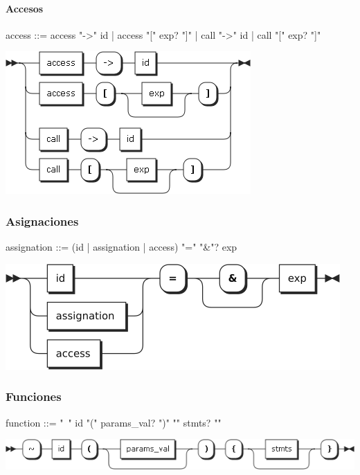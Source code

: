 \paragraph{Accesos}
\begin{multicols}{2}
\begin{myverbatim}[style=nonumbers, basicstyle=\tiny]      
access ::=  access "->" id
         |  access "[" exp? "]"
         |  call "->" id
         |  call "[" exp? "]"
\end{myverbatim}  
\columnbreak	
\begin{center}
\includegraphics[scale=0.4]{diagram/access.png} \\
\end{center}
\end{multicols}

\subsubsection{Asignaciones}
\begin{multicols}{2}
\begin{myverbatim}[style=nonumbers, basicstyle=\tiny]      
assignation ::=   
 (id | assignation | access)  "=" "&"? exp
\end{myverbatim}  
\columnbreak	
\begin{center}
\includegraphics[scale=0.5]{diagram/assignation.png} \\
\end{center}
\end{multicols}
\subsubsection{Funciones}
\begin{myverbatim}
function ::= "~" id "(" params_val? ")" "{" stmts? "}"
\end{myverbatim}
\begin{center}
\includegraphics[scale=0.5]{diagram/function.png} \\
\end{center}
